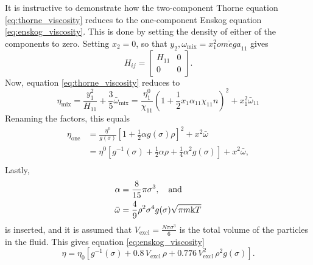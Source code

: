 

It is instructive to demonstrate how the two-component 
Thorne equation \eqref{eq:thorne_viscosity} reduces to 
the one-component Enskog equation \eqref{eq:enskog_viscosity}.
This is done by setting the density of either of the 
components to zero. Setting \(x_2 = 0\), so that 
\(y_2, \omega_\text{mix} = x_1^2\bar{omega}_{11}\)
gives 
\[
    H_{ij} = 
    \begin{bmatrix}
        H_{11}  & 0 \\
        0       & 0
    \end{bmatrix}.
\]
Now, equation \eqref{eq:thorne_viscosity} reduces to 
\[
    \eta_{\text{mix}} 
        = \frac{y_1^2}{H_{11}} 
        + \frac{3}{5} \bar{\omega}_{\text{mix}}
        = \frac{\eta^0_1}{\chi_{11}} \left(
            1   + \frac{1}{2} x_1 \alpha_{11} \chi_{11} n 
        \right)^2
        + x_1^2\bar{\omega}_{11}
\]
Renaming the factors, this equals
\[
    \begin{split}
    \eta_{\text{one}} 
        &= \frac{\eta^0}{g(\sigma)} \left[
            1+\frac{1}{2} \alpha g(\sigma) \rho
        \right]^2
        + x^2\bar{\omega} \\
        &= \eta^0\left[
            g^{-1}(\sigma) 
            + \frac{1}{2} \alpha \rho 
            + \frac{1}{4} \alpha^2 g(\sigma)
        \right]
        + x^2\bar{\omega}, \\
    \end{split}
\]
Lastly, 
\[
    \begin{split}
    \alpha
        &= \frac{8}{15} \pi \sigma^3, \quad \text{and} \\
    \bar{\omega}
        &= \frac{4}{9} \rho^2 \sigma^4 g(\sigma) \sqrt{\pi m \mathrm{k} T}
    \end{split}
\]
is inserted, and it is assumed that                 %
\(V_{\text{excl}} = \frac{N \pi \sigma^3}{6}\) 
is the total volume of the particles in the fluid.
This gives equation \eqref{eq:enskog_viscosity}
\[
    \eta 
        = \eta_0 \left[g^{-1}(\sigma) 
        + 0.8   \, V_{\text{excl}}      \,\rho 
        + 0.776 \, V_{\text{excl}}^2    \,\rho^2 g(\sigma) 
        \right].
\]

